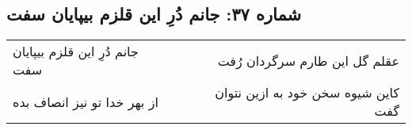 \begin{center}
\section*{شماره ۳۷: جانم دُرِ این قلزم بیپایان سفت}
\label{sec:037}
\begin{longtable}{l p{0.5cm} r}
جانم دُرِ این قلزم بیپایان سفت
&&
عقلم گل این طارم سرگردان رُفت
\\
از بهر خدا تو نیز انصاف بده
&&
کاین شیوه سخن خود به ازین نتوان گفت
\\
\end{longtable}
\end{center}
